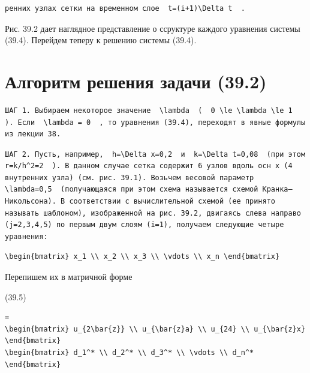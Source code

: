 \documentclass[
  ukrainian,
]{article}
\begin{document}
\begin{verbatim}
ренних узлах сетки на временном слое  t=(i+1)\Delta t  .
\end{verbatim}

Рис. 39.2 дает наглядное представление о ссруктуре каждого уравнения
системы (39.4). Перейдем теперу к решению системы (39.4).

\section{Алгоритм решения задачи
(39.2)}\label{ux430ux43bux433ux43eux440ux438ux442ux43c-ux440ux435ux448ux435ux43dux438ux44f-ux437ux430ux434ux430ux447ux438-39.2}

\begin{verbatim}
ШАГ 1. Выбираем некоторое значение  \lambda  (  0 \le \lambda \le 1  ). Если  \lambda = 0  , то уравнения (39.4), переходят в явные формулы из лекции 38.
\end{verbatim}

\begin{verbatim}
ШАГ 2. Пусть, например,  h=\Delta x=0,2  и  k=\Delta t=0,08  (при этом  r=k/h^2=2  ). В данном случае сетка содержит 6 узлов вдоль осн x (4 внутренних узла) (см. рис. 39.1). Возьчем весовой параметр  \lambda=0,5  (получающаяся при этом схема называется схемой Кранка—Никольсона). В соответствии с вычислительной схемой (ее принято называть шаблоном), изображенной на рис. 39.2, двигаясь слева направо (j=2,3,4,5) по первым двум слоям (i=1), получаем следующие четыре уравнения:
\end{verbatim}

\begin{verbatim}
\begin{bmatrix} x_1 \\ x_2 \\ x_3 \\ \vdots \\ x_n \end{bmatrix}
\end{verbatim}

Перепишем их в матричной форме

(39.5)

\begin{verbatim}
=
\begin{bmatrix} u_{2\bar{z}} \\ u_{\bar{z}a} \\ u_{24} \\ u_{\bar{z}x} \end{bmatrix}
\begin{bmatrix} d_1^* \\ d_2^* \\ d_3^* \\ \vdots \\ d_n^* \end{bmatrix}
\end{verbatim}
\end{document}
